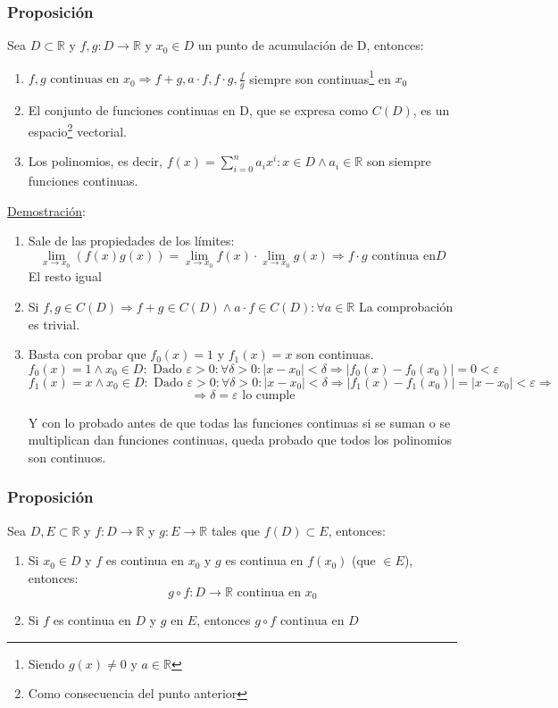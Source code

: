 \documentclass[10pt,a4paper,openright]{book}
\begin{document}
\subsubsection*{Proposición}
Sea $D\subset \mathbb R$ y $f,g: D\longrightarrow \mathbb R$ y $x_0\in D$ un punto de acumulación de D, entonces:
\begin{enumerate}
\item $f,g\mbox{  continuas en }x_0\Rightarrow f+g, a\cdot f, f\cdot g, \frac{f}{g}$ siempre son continuas\footnote{Siendo $g(x)\neq 0$ y $a\in \mathbb R$} en $x_0$

\item El conjunto de funciones continuas en D, que se expresa como $C(D)$, es un espacio\footnote{Como consecuencia del punto anterior} vectorial.

\item Los polinomios, es decir, $f(x)=\sum_{i=0}^n a_ix^i: x\in D\wedge a_i\in \mathbb R$ son siempre funciones continuas.
\end{enumerate}

\underline{Demostración}:
\begin{enumerate}
\item Sale de las propiedades de los límites:
$$\lim_{x\rightarrow x_0}(f(x)g(x))=\lim_{x\rightarrow x_0}f(x)\cdot \lim_{x\rightarrow x_0}g(x)\Rightarrow f\cdot g \mbox{ continua en} D$$
El resto igual

\item Si $f,g\in C(D)\Rightarrow f+g\in C(D)\wedge a\cdot f\in C(D): \forall a\in \mathbb R$
La comprobación es trivial.

\item Basta con probar que $f_0(x)=1$ y $f_1(x)=x$ son continuas.
$$f_0(x)=1\wedge x_0 \in D: \mbox{ Dado }\varepsilon>0: \forall \delta >0: |x-x_0|<\delta\Rightarrow |f_0(x)-f_0(x_0)|=0<\varepsilon$$
$$f_1(x)=x\wedge x_0 \in D:\mbox{ Dado }\varepsilon>0: \forall \delta >0: |x-x_0|<\delta\Rightarrow |f_1(x)-f_1(x_0)|=|x-x_0|<\varepsilon\Rightarrow$$
$$\Rightarrow \delta =\varepsilon \mbox{ lo cumple}$$

Y con lo probado antes de que todas las funciones continuas si se suman o se multiplican dan funciones continuas, queda probado que todos los polinomios son continuos.
\end{enumerate}

\subsubsection*{Proposición}
Sea $D, E\subset \mathbb R$ y $f: D\longrightarrow \mathbb R$ y $g: E\longrightarrow \mathbb R$ tales que $f(D)\subset E$, entonces:
\begin{enumerate}
\item Si $x_0\in D$ y $f$ es continua en $x_0$ y $g$ es continua en $f(x_0)$ (que $\in E$), entonces:
$$g\circ f: D\longrightarrow \mathbb R\mbox{ continua en }x_0$$

\item Si $f$ es continua en $D$ y $g$ en $E$, entonces $g\circ f\mbox{ continua en } D$
\end{enumerate}
\end{document}
